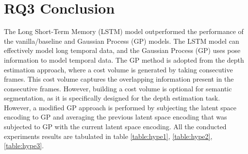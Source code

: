 	
	\newpage
	
	\section{RQ3 Conclusion}   
	
	The Long Short-Term Memory (LSTM) model outperformed the performance of the vanilla/baseline and Gaussian Process (GP) models. The LSTM model can effectively model long temporal data, and the Gaussian Process (GP) uses pose information to model temporal data. The GP method is adopted from the depth estimation approach, where a cost volume is generated by taking consecutive frames. This cost volume captures the overlapping information present in the consecutive frames. However, building a cost volume is optional for semantic segmentation, as it is specifically designed for the depth estimation task.
	However, a modified GP approach is performed by subjecting the latent space encoding to GP and averaging the previous latent space encoding that was subjected to GP with the current latent space encoding. All the conducted experiments results are tabulated in table \ref{table:hype1}, \ref{table:hype2}, \ref{table:hype3}.
	
	
	


